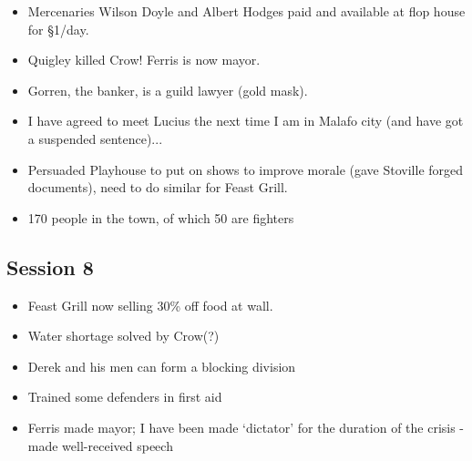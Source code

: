 \documentclass[10pt,a4paper]{article}
\begin{document}
  \begin{itemize}
    \item Mercenaries Wilson Doyle and Albert Hodges paid and available at flop house for §1/day.
    \item Quigley killed Crow! Ferris is now mayor.
    \item Gorren, the banker, is a guild lawyer (gold mask).
    \item I have agreed to meet Lucius the next time I am in Malafo city (and have got a suspended sentence)...
    \item Persuaded Playhouse to put on shows to improve morale (gave Stoville forged documents), need to do similar for Feast Grill.
    \item 170 people in the town, of which 50 are fighters
  \end{itemize}
  
\subsection*{Session 8}

  \begin{itemize}
    \item Feast Grill now selling 30\% off food at wall.
    \item Water shortage solved by Crow(?)
    \item Derek and his men can form a blocking division
    \item Trained some defenders in first aid
    \item Ferris made mayor; I have been made `dictator' for the duration of the crisis - made well-received speech
  \end{itemize}
\end{document}
